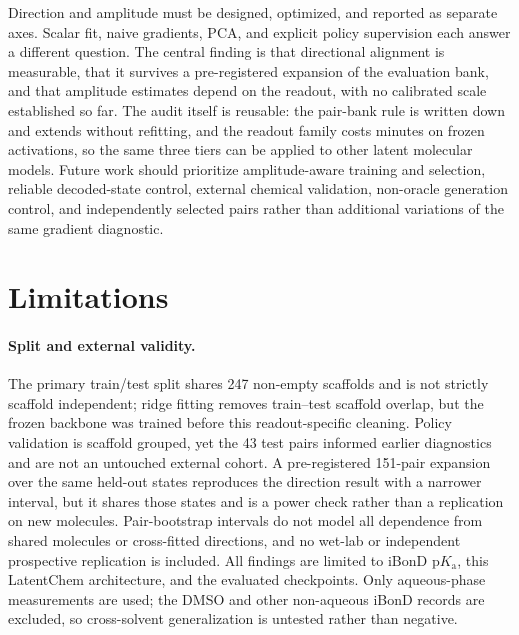 \documentclass[11pt]{article}
\newcommand{\pka}{\mathrm{p}K_{\mathrm a}}
\begin{document}
Direction and amplitude must be designed, optimized, and reported as separate axes. Scalar fit, naive gradients, PCA, and explicit policy supervision each answer a different question. The central finding is that directional alignment is measurable, that it survives a pre-registered expansion of the evaluation bank, and that amplitude estimates depend on the readout, with no calibrated scale established so far. The audit itself is reusable: the pair-bank rule is written down and extends without refitting, and the readout family costs minutes on frozen activations, so the same three tiers can be applied to other latent molecular models. Future work should prioritize amplitude-aware training and selection, reliable decoded-state control, external chemical validation, non-oracle generation control, and independently selected pairs rather than additional variations of the same gradient diagnostic.

\section{Limitations}
\label{sec:limitations}

\paragraph{Split and external validity.} The primary train/test split shares 247 non-empty scaffolds and is not strictly scaffold independent; ridge fitting removes train--test scaffold overlap, but the frozen backbone was trained before this readout-specific cleaning. Policy validation is scaffold grouped, yet the 43 test pairs informed earlier diagnostics and are not an untouched external cohort. A pre-registered 151-pair expansion over the same held-out states reproduces the direction result with a narrower interval, but it shares those states and is a power check rather than a replication on new molecules. Pair-bootstrap intervals do not model all dependence from shared molecules or cross-fitted directions, and no wet-lab or independent prospective replication is included. All findings are limited to iBonD $\pka$, this LatentChem architecture, and the evaluated checkpoints. Only aqueous-phase measurements are used; the DMSO and other non-aqueous iBonD records are excluded, so cross-solvent generalization is untested rather than negative.
\end{document}
